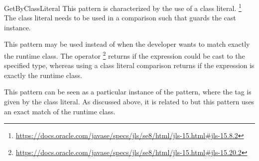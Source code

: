 \begin{pattern}{GetByClassLiteral}
\detection{}
This pattern is characterized by the use of a class literal.%
\footnote{\url{https://docs.oracle.com/javase/specs/jls/se8/html/jls-15.html\#jls-15.8.2}}
The class literal needs to be used in a comparison such that guards the cast instance.

\discussion{}
This pattern may be used instead of  when the developer wants to match exactly the runtime class.
The  operator%
\footnote{\url{https://docs.oracle.com/javase/specs/jls/se8/html/jls-15.html\#jls-15.20.2}}
returns  if the expression could be cast to the specified type,
whereas using a class literal comparison returns  if the expression is exactly the runtime class.

\related{}
This pattern can be seen as a particular instance of the  pattern,
where the tag is given by the class literal.
As discussed above, it is related to  but this pattern uses an exact match of the runtime class.

\end{pattern}